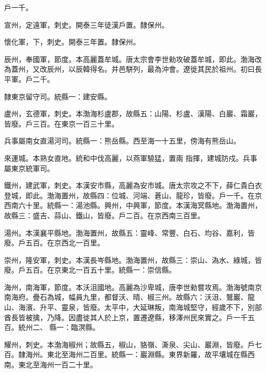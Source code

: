 \begin{pinyinscope}
 戶一千。



 宣州，定遠軍，刺史。開泰三年徒漢戶置。隸保州。



 懷化軍，下，刺史。開泰三年置。隸保州。



 辰州，奉國軍，節度。本高麗蓋牟城。唐太宗會李世勑攻破蓋牟城，即此。渤海改為蓋州，又改辰州，以辰韓得名。井邑駢列，最為沖會。遼徙其民於祖州。初曰長平軍。戶二千。



 隸東京留守司。統縣一：建安縣。



 盧州，玄德軍，刺史。本渤海杉盧郡，故縣五：山陽、杉盧、漢陽、白巖、霜巖，皆廢。戶三百。在東京一百三十里。



 兵事屬南女直湯河司。統縣一：熊岳縣。西至海一十五里，傍海有熊岳山。



 來運城。本熟女直地。統和中伐高麗，以燕軍驍猛，置兩
 指揮，建城防戍。兵事屬東京統軍司。



 鐵州，建武軍，刺史。本漢安市縣，高麗為安市城。唐太宗攻之不下，薛仁貴白衣登城，即此。渤海置州，故縣四：位城、河端、蒼山、龍珍，皆廢。戶一千。在京西南六十里。統縣一：湯池縣。興州，中興軍，節度。本漢海冥縣地。渤海置州，故縣三：盛吉、蒜山、鐵山，皆廢。戶二百。在京西南三百里。



 湯州。本漢襄平縣地。渤海置州，故縣五：靈峰、常豐、白石、均谷、嘉利，皆廢。戶五百。在京西北一百里。



 崇州，隆安軍，刺史。本漢長岑縣地。渤海置州，故縣三：崇山、溈水、綠城，皆廢。戶五百。在京東北一百五十里。統縣一：崇信縣。



 海州，南海軍，節度。本沃沮國地。高麗為沙卑城，唐李世勑嘗攻焉。渤海號南京南海府。疊石為城，幅員九里，都督沃、晴、椒三州。故縣六：沃沮、鷲巖、龍山、海濱、升平、靈泉，皆廢。太平中，大延琳叛，南海城堅守，經歲不下，別部酋長皆被擒，乃降。因盡徙其人於上京，置遷遼縣，移澤州民來實之。戶一千五百。統州二、
 縣一：臨溟縣。



 耀州，刺史。本渤海椒州；故縣五，椒山，貉嶺、澌泉、尖山、巖淵，皆廢。戶七百。隸海州。東北至海州二百里。統縣一：巖淵縣。東界新羅，故平壤城在縣西南。東北至海州一百二十里。




\end{pinyinscope}
